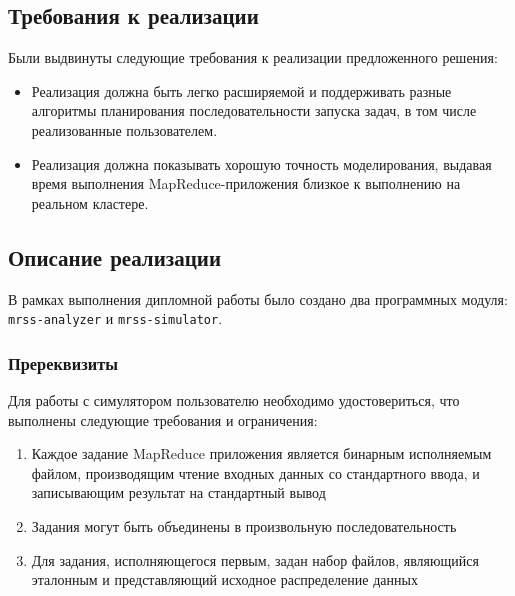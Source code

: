 \documentclass[../diploma.tex]{subfile}
\begin{document}
 
    \subsection{Требования к реализации}
    \label{sec:results:subsec:requirements}

    Были выдвинуты следующие требования к реализации предложенного решения:

    \begin{itemize}
        \item Реализация должна быть легко расширяемой и поддерживать разные
              алгоритмы планирования последовательности запуска задач, в том
              числе реализованные пользователем.
        \item Реализация должна показывать хорошую точность моделирования,
              выдавая время выполнения MapReduce-приложения близкое к выполнению
              на реальном кластере.
    \end{itemize}

    \subsection{Описание реализации}
    \label{sec:results:subsec:final}

    В рамках выполнения дипломной работы было создано два программных модуля:
    \texttt{mrss-analyzer} и \texttt{mrss-simulator}.

    \subsubsection{Пререквизиты}

    Для работы с симулятором пользователю необходимо удостовериться, что
    выполнены следующие требования и ограничения:

    \begin{enumerate}
        \item Каждое задание MapReduce приложения является бинарным исполняемым
              файлом, производящим чтение входных данных со стандартного ввода,
              и записывающим результат на стандартный вывод
        \item Задания могут быть объединены в произвольную последовательность
        \item Для задания, исполняющегося первым, задан набор файлов, являющийся
              эталонным и представляющий исходное распределение данных
    \end{enumerate}
\end{document}
